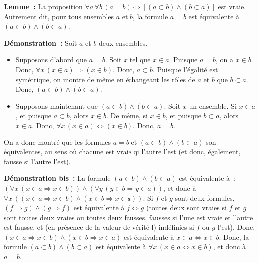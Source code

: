 \done

\medskip

\noindent\textbf{Lemme :} La proposition $\forall a \, \forall b \, (a = b) \Leftrightarrow [(a \subset b) \wedge (b \subset a)]$ est vraie.
    Autrement dit, pour tous ensembles $a$ et $b$, la formule $a = b$ est équivalente à $(a \subset b) \wedge (b \subset a)$.

\medskip

\noindent\textbf{Démonstration :} 
    Soit $a$ et $b$ deux ensembles. 
    \begin{itemize}[nosep]
        \item Supposons d'abord que $a = b$.
            Soit $x$ tel que $x \in a$. 
            Puisque $a = b$, on a $x \in b$. 
            Donc, $\forall x \, (x \in a) \Rightarrow (x \in b)$.
            Donc, $a \subset b$. 
            Puisque l'égalité est symétrique, on montre de même en échangeant les rôles de $a$ et $b$ que $b \subset a$.
            Donc, $(a \subset b) \wedge (b \subset a)$. 
        \item Supposons maintenant que $(a \subset b) \wedge (b \subset a)$. 
            Soit $x$ un ensemble. 
            Si $x \in a$, et puisque $a \subset b$, alors $x \in b$.
            De même, si $x \in b$, et puisque $b \subset a$, alors $x \in a$.
            Donc, $\forall x \, (x \in a) \Leftrightarrow (x \in b)$. 
            Donc, $a = b$. 
    \end{itemize}
    On a donc montré que les formules $a = b$ et $(a \subset b) \wedge (b \subset a)$ son équivalentes, au sens où chacune est vraie qi l'autre l'est (et donc, également, fausse si l'autre l'est).

   \done 

\medskip

\noindent\textbf{Démonstration bis :} 
    La formule $(a \subset b) \wedge (b \subset a)$ est équivalente à : $(\forall x \, (x \in a \Rightarrow x \in b)) \wedge (\forall y \, (y \in b \Rightarrow y \in a))$, et donc à $\forall x \, ((x \in a \Rightarrow x \in b) \wedge (x \in b \Rightarrow x \in a))$. 
    Si $f$ et $g$ sont deux formules, $(f \Rightarrow g) \wedge (g \Rightarrow f)$ est équivalente à $f \Leftrightarrow g$ (toutes deux sont vraies si $f$ et $g$ sont toutes deux vraies ou toutes deux fausses, fausses si l'une est vraie et l'autre est fausse, et (en présence de la valeur de vérité $\mathsf{I}$) indéfinies si $f$ ou $g$ l'est).
    Donc, $(x \in a \Rightarrow x \in b) \wedge (x \in b \Rightarrow x \in a)$ est équivalente à $x \in a \Leftrightarrow x \in b$.
    Donc, la formule $(a \subset b) \wedge (b \subset a)$ est équivalente à $\forall x \, (x \in a \Leftrightarrow x \in b)$, et donc à $a = b$.

